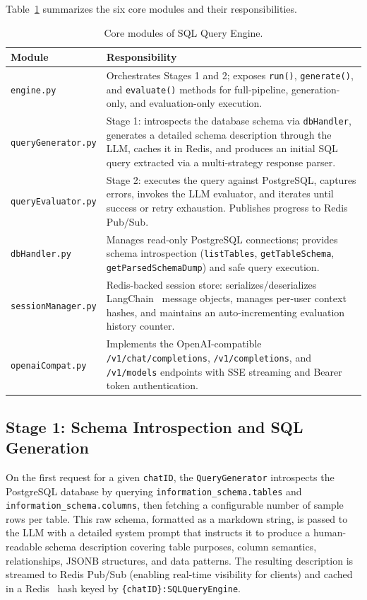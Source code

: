\documentclass{article}
\begin{document}
Table~\ref{tab:modules} summarizes the six core modules and their responsibilities.

\begin{table}[ht]
\centering
\caption{Core modules of SQL Query Engine.}
\label{tab:modules}
\small
\begin{tabular}{@{}lp{9.5cm}@{}}
\toprule
\textbf{Module} & \textbf{Responsibility} \\
\midrule
\texttt{engine.py}          & Orchestrates Stages 1 and 2; exposes \texttt{run()}, \texttt{generate()}, and \texttt{evaluate()} methods for full-pipeline, generation-only, and evaluation-only execution. \\
\texttt{queryGenerator.py}  & Stage 1: introspects the database schema via \texttt{dbHandler}, generates a detailed schema description through the LLM, caches it in Redis, and produces an initial SQL query extracted via a multi-strategy response parser. \\
\texttt{queryEvaluator.py}  & Stage 2: executes the query against PostgreSQL, captures errors, invokes the LLM evaluator, and iterates until success or retry exhaustion. Publishes progress to Redis Pub/Sub. \\
\texttt{dbHandler.py}       & Manages read-only PostgreSQL connections; provides schema introspection (\texttt{listTables}, \texttt{getTableSchema}, \texttt{getParsedSchemaDump}) and safe query execution. \\
\texttt{sessionManager.py}  & Redis-backed session store: serializes/deserializes LangChain~\citep{langchain2022} message objects, manages per-user context hashes, and maintains an auto-incrementing evaluation history counter. \\
\texttt{openaiCompat.py}    & Implements the OpenAI-compatible \texttt{/v1/chat/completions}, \texttt{/v1/completions}, and \texttt{/v1/models} endpoints with SSE streaming and Bearer token authentication. \\
\bottomrule
\end{tabular}
\end{table}

\subsection{Stage 1: Schema Introspection and SQL Generation}

On the first request for a given \texttt{chatID}, the \texttt{QueryGenerator} introspects the PostgreSQL database by querying \texttt{information\_schema.tables} and \texttt{information\_schema.columns}, then fetching a configurable number of sample rows per table. This raw schema, formatted as a markdown string, is passed to the LLM with a detailed system prompt that instructs it to produce a human-readable schema description covering table purposes, column semantics, relationships, JSONB structures, and data patterns. The resulting description is streamed to Redis Pub/Sub (enabling real-time visibility for clients) and cached in a Redis~\citep{redis2009} hash keyed by \texttt{\{chatID\}:SQLQueryEngine}.
\end{document}
